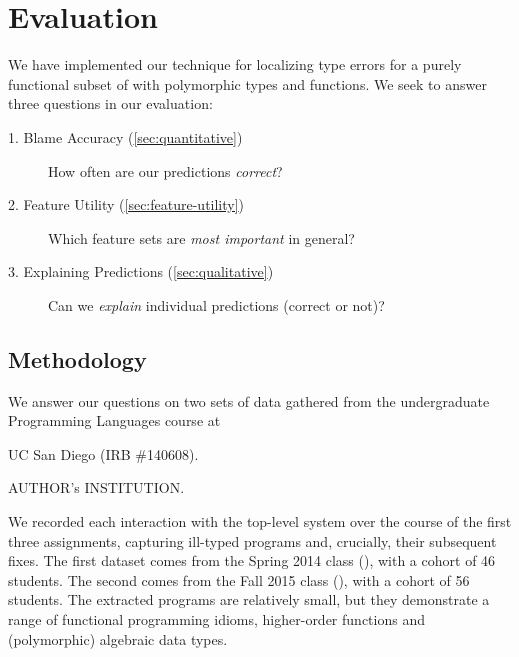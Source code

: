 \section{Evaluation}
\label{sec:evaluation}


We have implemented our technique for localizing type errors for a
purely functional subset of \ocaml with polymorphic types and functions.
%
We seek to answer three questions in our evaluation:
%
\begin{description}
\item[1. Blame Accuracy (\autoref{sec:quantitative})]
  How often are our predictions \emph{correct}?
\item[2. Feature Utility (\autoref{sec:feature-utility})]
  Which feature sets are \emph{most important} in general?
\item[3. Explaining Predictions (\autoref{sec:qualitative})]
  Can we \emph{explain} individual predictions (correct or not)?
\end{description}

\subsection{Methodology}
\label{sec:methodology}

We answer our questions on two sets of data gathered from the
undergraduate Programming Languages course at
\begin{anonsuppress}
UC San Diego (IRB \#140608).
\end{anonsuppress}
\begin{noanonsuppress}
AUTHOR's INSTITUTION.
\end{noanonsuppress}
%
We recorded each interaction with the \ocaml top-level system over the
course of the first three assignments, capturing
ill-typed programs and, crucially, their subsequent fixes.
%
The first dataset comes from the Spring 2014 class (\SPRING), with a
cohort of 46 students. The second comes from the Fall 2015 class
(\FALL), with a cohort of 56 students.
%
The extracted programs are relatively small, but they demonstrate a
range of functional programming idioms, \eg higher-order functions and
(polymorphic) algebraic data types.

